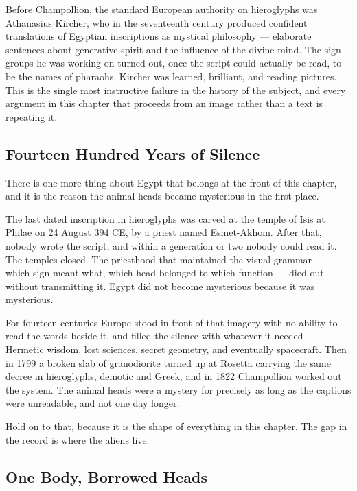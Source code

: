 \begin{funfact}
Before Champollion, the standard European authority on hieroglyphs was Athanasius Kircher, who
in the seventeenth century produced confident translations of Egyptian inscriptions as mystical
philosophy --- elaborate sentences about generative spirit and the influence of the divine mind.
The sign groups he was working on turned out, once the script could actually be read, to be the
names of pharaohs. Kircher was learned, brilliant, and reading pictures. This is the single most
instructive failure in the history of the subject, and every argument in this chapter that
proceeds from an image rather than a text is repeating it.
\end{funfact}

\subsection{Fourteen Hundred Years of Silence}\label{sec:silentscript}

There is one more thing about Egypt that belongs at the front of this chapter, and it is the
reason the animal heads became mysterious in the first place.

The last dated inscription in hieroglyphs was carved at the temple of Isis at Philae on 24 August
394 CE, by a priest named Esmet-Akhom. After that, nobody wrote the script, and within a
generation or two nobody could read it. The temples closed. The priesthood that maintained the
visual grammar --- which sign meant what, which head belonged to which function --- died out
without transmitting it. Egypt did not become mysterious because it was mysterious. 

For fourteen centuries Europe stood in front of that imagery with no ability to read the words
beside it, and filled the silence with whatever it needed --- Hermetic wisdom, lost sciences,
secret geometry, and eventually spacecraft. Then in 1799 a broken slab of granodiorite turned up
at Rosetta carrying the same decree in hieroglyphs, demotic and Greek, and in 1822 Champollion
worked out the system. The animal heads were a mystery for precisely as long as the captions were
unreadable, and not one day longer.

Hold on to that, because it is the shape of everything in this chapter. The gap in the record is
where the aliens live.

\subsection{One Body, Borrowed Heads}\label{sec:borrowedheads}

